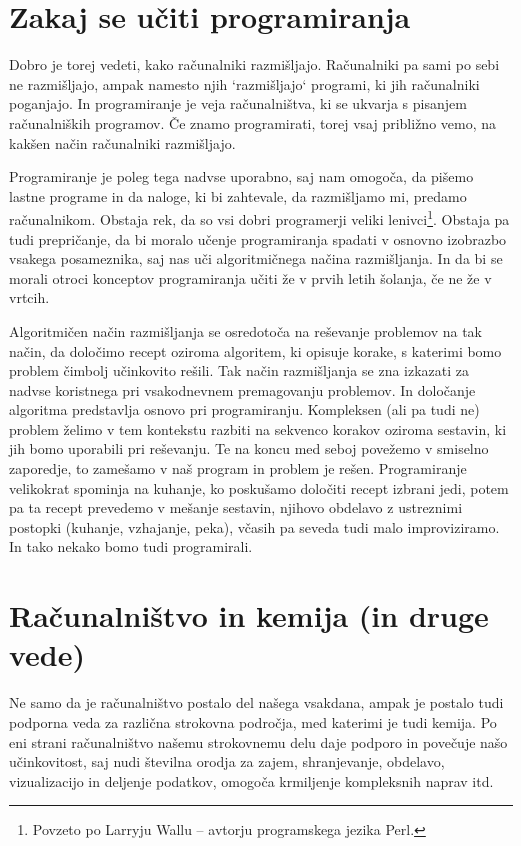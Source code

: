 \section{Zakaj se učiti programiranja}

Dobro je torej vedeti, kako računalniki razmišljajo. Računalniki pa sami po sebi ne razmišljajo, ampak namesto njih `razmišljajo` programi, ki jih računalniki poganjajo. In programiranje je veja računalništva, ki se ukvarja s pisanjem računalniških programov. Če znamo programirati, torej vsaj približno vemo, na kakšen način računalniki razmišljajo.

Programiranje je poleg tega nadvse uporabno, saj nam omogoča, da pišemo lastne programe in da naloge, ki bi zahtevale, da razmišljamo mi, predamo računalnikom. Obstaja rek, da so vsi dobri programerji veliki lenivci\footnote{Povzeto po Larryju Wallu -- avtorju programskega jezika Perl.}. Obstaja pa tudi prepričanje, da bi moralo učenje programiranja spadati v osnovno izobrazbo vsakega posameznika, saj nas uči algoritmičnega načina razmišljanja. In da bi se morali otroci konceptov programiranja učiti že v prvih letih šolanja, če ne že v vrtcih.

Algoritmičen način razmišljanja se osredotoča na reševanje problemov na tak način, da določimo recept oziroma algoritem, ki opisuje korake, s katerimi bomo problem čimbolj učinkovito rešili. Tak način razmišljanja se zna izkazati za nadvse koristnega pri vsakodnevnem premagovanju problemov. In določanje algoritma predstavlja osnovo pri programiranju. Kompleksen (ali pa tudi ne) problem želimo v tem kontekstu razbiti na sekvenco korakov oziroma sestavin, ki jih bomo uporabili pri reševanju. Te na koncu med seboj povežemo v smiselno zaporedje, to zamešamo v naš program in problem je rešen. Programiranje velikokrat spominja na kuhanje, ko poskušamo določiti recept izbrani jedi, potem pa ta recept prevedemo v mešanje sestavin, njihovo obdelavo z ustreznimi postopki (kuhanje, vzhajanje, peka), včasih pa seveda tudi malo improviziramo. In tako nekako bomo tudi programirali. 

\section{Računalništvo in kemija (in druge vede)}

Ne samo da je računalništvo postalo del našega vsakdana, ampak je postalo tudi podporna veda za različna strokovna področja, med katerimi je tudi kemija. Po eni strani računalništvo našemu strokovnemu delu daje podporo in povečuje našo učinkovitost, saj nudi številna orodja za zajem, shranjevanje, obdelavo, vizualizacijo in deljenje podatkov, omogoča krmiljenje kompleksnih naprav itd. 

